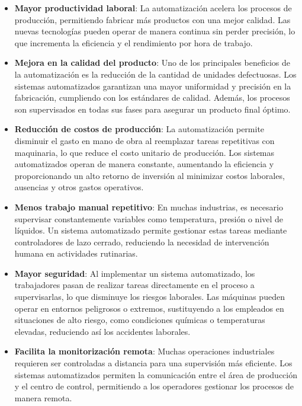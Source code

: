 \begin{itemize}
    \item \textbf{Mayor productividad laboral}: La automatización acelera los procesos de producción, permitiendo fabricar más productos con una mejor calidad. Las nuevas tecnologías pueden operar de manera continua sin perder precisión, lo que incrementa la eficiencia y el rendimiento por hora de trabajo.
    
    \item \textbf{Mejora en la calidad del producto}: Uno de los principales beneficios de la automatización es la reducción de la cantidad de unidades defectuosas. Los sistemas automatizados garantizan una mayor uniformidad y precisión en la fabricación, cumpliendo con los estándares de calidad. Además, los procesos son supervisados en todas sus fases para asegurar un producto final óptimo.
    
    \item \textbf{Reducción de costos de producción}: La automatización permite disminuir el gasto en mano de obra al reemplazar tareas repetitivas con maquinaria, lo que reduce el costo unitario de producción. Los sistemas automatizados operan de manera constante, aumentando la eficiencia y proporcionando un alto retorno de inversión al minimizar costos laborales, ausencias y otros gastos operativos.
    
    \item \textbf{Menos trabajo manual repetitivo}: En muchas industrias, es necesario supervisar constantemente variables como temperatura, presión o nivel de líquidos. Un sistema automatizado permite gestionar estas tareas mediante controladores de lazo cerrado, reduciendo la necesidad de intervención humana en actividades rutinarias.
    
    \item \textbf{Mayor seguridad}: Al implementar un sistema automatizado, los trabajadores pasan de realizar tareas directamente en el proceso a supervisarlas, lo que disminuye los riesgos laborales. Las máquinas pueden operar en entornos peligrosos o extremos, sustituyendo a los empleados en situaciones de alto riesgo, como condiciones químicas o temperaturas elevadas, reduciendo así los accidentes laborales.
    
    \item \textbf{Facilita la monitorización remota}: Muchas operaciones industriales requieren ser controladas a distancia para una supervisión más eficiente. Los sistemas automatizados permiten la comunicación entre el área de producción y el centro de control, permitiendo a los operadores gestionar los procesos de manera remota.
\end{itemize}

